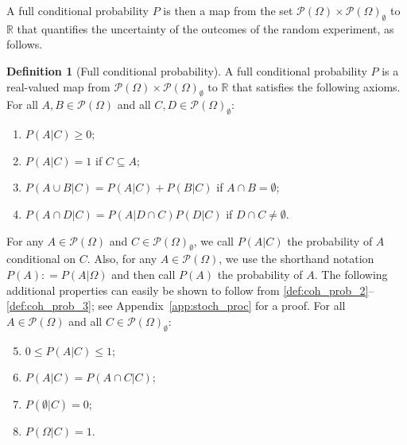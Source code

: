 \documentclass[10pt,a4paper]{paper}
\theoremstyle{definition}
\newtheorem{definition}{Definition}
\newcommand{\reals}{\mathbb{R}}
\newcommand{\paths}{\Omega}
\newcommand{\power}{\mathcal{P}(\paths)}
\newcommand{\nonemptypower}{\power_{\emptyset}}
\newcommand{\coloneqq}{:\!=}
\begin{document}
A full conditional probability $P$ is then a map from the set $\power\times\nonemptypower$ to $\reals$ that quantifies the uncertainty of the outcomes of the random experiment, as follows.

\begin{definition}[Full conditional probability]\label{def:cond_prob}
A full conditional probability $P$ is a real-valued map from $\power\times\nonemptypower$ to $\reals$ that satisfies the following axioms. For all $A,B\in\power$ and all \mbox{$C,D\in\nonemptypower$}:
\vspace{5pt}

\begin{enumerate}[label=F\arabic*:,ref=F\arabic*]
\item
$P(A\vert C)\geq 0$;\label{def:coh_prob_2}
\item
$P(A\vert C)=1$ if $C\subseteq A$;\label{def:coh_prob_1}
\item
$P(A\cup B\vert C)=P(A\vert C)+P(B\vert C)$ if $A\cap B=\emptyset$;\label{def:coh_prob_3}
\item
$P(A\cap D\vert C)=P(A\vert D\cap C)P(D\vert C)$ if $D\cap C\neq\emptyset$.\label{def:coh_prob_6}
\end{enumerate}
\vspace{5pt}

\noindent
For any $A\in\power$ and $C\in\nonemptypower$, we call $P(A\vert C)$ the probability of $A$ conditional on $C$. Also, for any $A\in\power$, we use the shorthand notation $P(A)\coloneqq P(A\vert\paths)$ and then call $P(A)$ the probability of $A$.
The following additional properties can easily be shown to follow from \ref{def:coh_prob_2}--\ref{def:coh_prob_3}; see Appendix~\ref{app:stoch_proc} for a proof. For all $A\in\power$ and all $C\in\nonemptypower$:
\vspace{5pt}
\begin{enumerate}[label=F\arabic*:,ref=F\arabic*]
\setcounter{enumi}{4}
\item
$0\leq P(A\vert C)\leq 1$;\label{def:coh_prob_2b}
\item
$P(A\vert C)=P(A\cap C\vert C)$;\label{def:coh_prob_7}
\item
$P(\emptyset\vert C)=0$;\label{def:coh_prob_8}
\item
$P(\Omega\vert C)=1$.\label{def:coh_prob_5}
\end{enumerate}
\vspace{5pt}
\end{definition}
\end{document}
